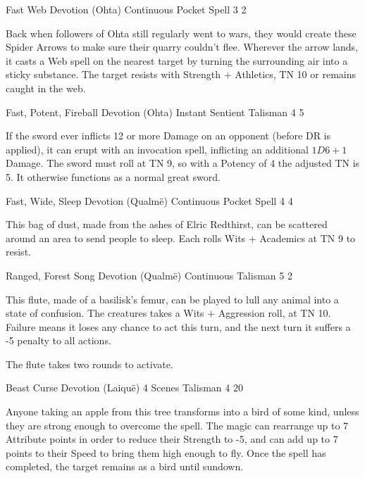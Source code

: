 \begin{multicols}{2}
	{Fast Web}%
	{Devotion (Ohta)}%
	{Continuous}%
	{Pocket Spell}%
	{3}%
	{2}%

\label{spiderarrows}

Back when followers of Ohta still regularly went to wars, they would create these Spider Arrows to make sure their quarry couldn't flee.
Wherever the arrow lands, it casts a Web spell on the nearest target by turning the surrounding air into a sticky substance.
The target resists with Strength + Athletics, TN 10 or remains caught in the web.

	{Fast, Potent, Fireball}%
	{Devotion (Ohta)}%
	{Instant}%
	{Sentient Talisman}%
	{4}%
	{5}%
\label{godslayer}

If the sword ever inflicts 12 or more Damage on an opponent (before DR is applied), it can erupt with an invocation spell, inflicting an additional $1D6 + 1$ Damage.
The sword must roll at TN 9, so with a Potency of 4 the adjusted TN is 5.
It otherwise functions as a normal great sword.

	{Fast, Wide, Sleep}%
	{Devotion (Qualm\"e)}%
	{Continuous}%
	{Pocket Spell}%
	{4}%
	{4}%

This bag of dust, made from the ashes of Elric Redthirst, can be scattered around an area to send people to sleep.
Each rolls Wits + Academics at TN 9 to resist.

	{Ranged, Forest Song}%
	{Devotion (Qualm\"e)}%
	{Continuous}%
	{Talisman}%
	{5}%
	{2}%

This flute, made of a basilisk's femur, can be played to lull any animal into a state of confusion.
The creatures takes a Wits + Aggression roll, at TN 10.
Failure means it loses any chance to act this turn, and the next turn it suffers a -5 penalty to all actions.

The flute takes two rounds to activate.

	{Beast Curse}%
	{Devotion (Laiqu\"{e})}%
	{4 Scenes}%
	{Talisman}%
	{4}%
	{20}%

Anyone taking an apple from this tree transforms into a bird of some kind, unless they are strong enough to overcome the spell.
The magic can rearrange up to 7 Attribute points in order to reduce their Strength to -5, and can add up to 7 points to their Speed to bring them high enough to fly.
Once the spell has completed, the target remains as a bird until sundown.


\end{multicols}
